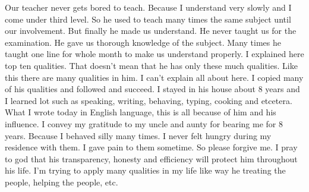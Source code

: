 Our teacher never gets bored to teach. Because I understand very slowly and I come under third level. So he used to teach many times the same subject until our involvement. But finally he made us understand. He never taught us for the examination. He gave us thorough knowledge of the subject. Many times he taught one line for whole month to make us understand properly.
I explained here top ten qualities. That doesn’t mean that he has only these much qualities. Like this there are many qualities in him. I can’t explain all about here. I copied many of his qualities and followed and succeed. I stayed in his house about 8 years and I learned lot such as speaking, writing, behaving, typing, cooking and etcetera. What I wrote today in English language, this is all because of him and his influence. I convey my gratitude to my uncle and aunty for bearing me for 8 years. Because I behaved silly many times. I never felt hungry during my residence with them. I gave pain to them sometime. So please forgive me. I pray to god that his transparency, honesty and efficiency will protect him throughout his life. I’m trying to apply many qualities in my life like way he treating the people, helping the people, etc.

\articleend
